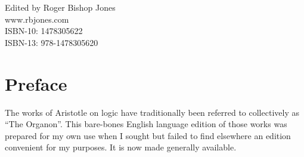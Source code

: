 \begin{titlepage}
\maketitle

\hspace{2in}

\vfill

\begin{centering}




\vfill

\vspace{0.1in}
Edited by Roger Bishop Jones\\
www.rbjones.com\\
\vspace{0.2in}
ISBN-10: 1478305622\\
ISBN-13: 978-1478305620\\
\vspace{0.2in}

{\footnotesize




}%

\end{centering}


\thispagestyle{empty}
\end{titlepage}

{\parskip=0pt\tableofcontents}

\vfill

\pagebreak

\chapter*{Preface}

The works of Aristotle on logic have traditionally been referred to collectively as ``The Organon''. 
This bare-bones English language edition of those works was prepared for my own use when I sought but failed to find elsewhere an edition convenient for my purposes.
It is now made generally available.
 
